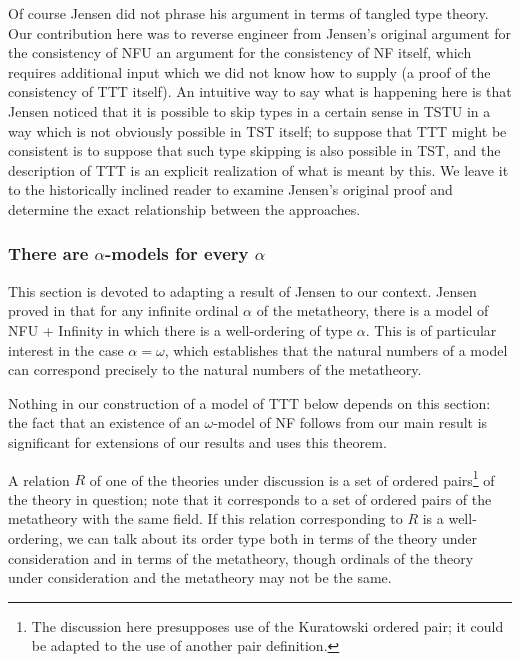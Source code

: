 \documentclass{article}
\theoremstyle{definition}
\theoremstyle{remark}
\begin{document}
{Of course Jensen did not phrase his argument in terms of tangled type theory.  Our contribution here was to reverse engineer from Jensen's original argument for the consistency of NFU an argument for the consistency of NF itself, which requires additional input which we did not know how to supply (a proof of the consistency of TTT itself).  An intuitive way to say what is happening here is that Jensen noticed that it is possible to skip types in a certain sense in TSTU in a way which is not obviously possible in TST itself;  to suppose that TTT might be consistent is to suppose that such type skipping is also possible in TST, and the description of TTT is an explicit realization of what is meant by this.  We leave it to the historically inclined reader to examine Jensen's original proof and determine the exact relationship between the approaches.

\newpage

\subsubsection{There are $\alpha$-models for every $\alpha$}\label{subsection:alpha_models}

This section is devoted to adapting a result of Jensen to our context.  Jensen proved in \cite{nfu} that for any infinite ordinal $\alpha$ of the metatheory, there is a model of NFU + Infinity in which there is a well-ordering of type $\alpha$.  This is of particular interest in the case $\alpha=\omega$, which establishes that the natural numbers of a model can correspond precisely to the natural numbers of the metatheory.

Nothing in our construction of a model of TTT below depends on this section:  the fact that an existence of an $\omega$-model of NF follows from our main result is significant for extensions of our results and uses this theorem.

A relation $R$ of one of the theories under discussion is a set of ordered pairs\footnote{The discussion here presupposes use of the Kuratowski ordered pair;  it could be adapted to the use of another pair definition.}  of the theory in question;  note that it corresponds to a set of ordered pairs of the metatheory with the same field.  If this relation corresponding to  $R$ is a well-ordering, we can talk about its order type both in terms of the theory under consideration and in terms of the metatheory, though ordinals of the theory under consideration and the metatheory may not be the same.

}
\end{document}
